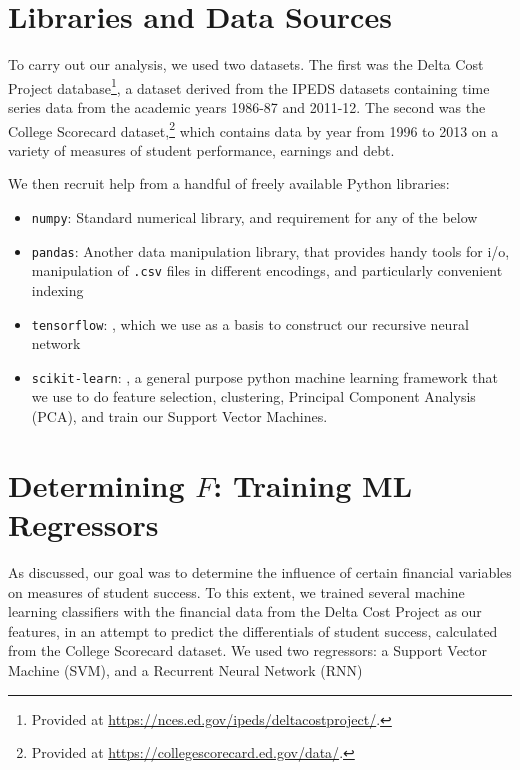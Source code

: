 \documentclass[paper.tex]{subfiles}
\begin{document}
\section{Libraries and Data Sources}
To carry out our analysis, we used two datasets. The first was the Delta Cost Project database\footnote{Provided at \url{https://nces.ed.gov/ipeds/deltacostproject/}.}, a dataset derived from the IPEDS datasets containing time series data from the academic years 1986-87 and 2011-12. The second was the College Scorecard dataset,\footnote{Provided at \url{https://collegescorecard.ed.gov/data/}.} which contains data by year from 1996 to 2013 on a variety of measures of student performance, earnings and debt. 

We then recruit help from a handful of freely available Python libraries: 
\begin{itemize}
	\setlength{\itemsep}{-0.3em}
	\item \texttt{numpy}: Standard numerical library, and requirement for any of the below
	\item \texttt{pandas}: Another data manipulation library, that provides handy tools for i/o, manipulation of \texttt{.csv} files in different encodings, and particularly convenient indexing
	\item \texttt{tensorflow}: \cite{tensorflow}, which we use as a basis to construct our recursive neural network 
	\item \texttt{scikit-learn}: \cite{scikit-learn}, a general purpose python machine learning framework that we use to do feature selection, clustering, Principal Component Analysis (PCA), and train our Support Vector Machines.
\end{itemize}

\section{Determining $F$: Training ML Regressors}
As discussed, our goal was to determine the influence of certain financial variables on measures of student success. To this extent, we trained several machine learning classifiers with the financial data from the Delta Cost Project as our features, in an attempt to predict the differentials of student success, calculated from the College Scorecard dataset. We used two regressors: a Support Vector Machine (SVM), and a Recurrent Neural Network (RNN)
\end{document}
